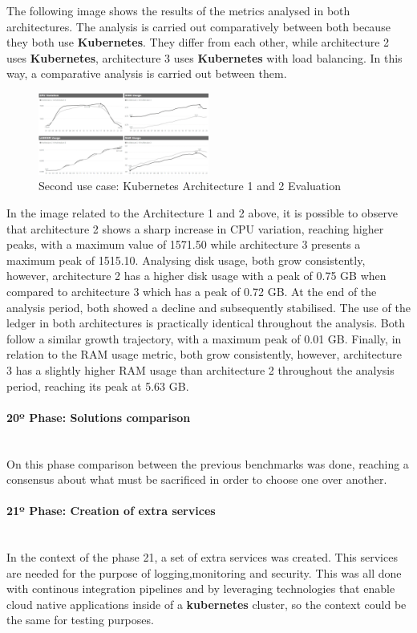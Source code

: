 The following image shows the results of the metrics analysed in both architectures. The analysis is carried out comparatively between both because they both use \textbf{Kubernetes}. They differ from each other, while architecture 2 uses \textbf{Kubernetes}, architecture 3 uses \textbf{Kubernetes} with load balancing. In this way, a comparative analysis is carried out between them.

\begin{figure}[H]
	\centering
	\includegraphics[width=0.5\textwidth]{assets/use-case-2/evaluation-of-k8-and-k8-with-lb.png} %
	\caption{Second use case: Kubernetes Architecture 1 and 2 Evaluation}
	\label{fig:sample-image} 
\end{figure}

In the image related to the Architecture 1 and 2 above, it is possible to observe that architecture 2 shows a sharp increase in CPU variation, reaching higher peaks, with a maximum value of 1571.50 while architecture 3 presents a maximum peak of 1515.10. 
Analysing disk usage, both grow consistently, however, architecture 2 has a higher disk usage with a peak of 0.75 GB when compared to architecture 3 which has a peak of 0.72 GB. At the end of the analysis period, both showed a decline and subsequently stabilised.
The use of the ledger in both architectures is practically identical throughout the analysis. Both follow a similar growth trajectory, with a maximum peak of 0.01 GB.
Finally, in relation to the RAM usage metric, both grow consistently, however, architecture 3 has a slightly higher RAM usage than architecture 2 throughout the analysis period, reaching its peak at 5.63 GB.



\paragraph{20º Phase: Solutions comparison}\mbox{}\\
On this phase comparison between the previous benchmarks was done, reaching a consensus about what must be sacrificed in order to choose one over another.

\paragraph{21º Phase: Creation of extra services}\mbox{}\\
In the context of the phase 21, a set of extra services was created. This services are needed for the purpose of logging,monitoring and security. This was all done with continous integration pipelines and by leveraging technologies that enable cloud native applications inside of a \textbf{kubernetes} cluster, so the context could be the same for testing purposes.

